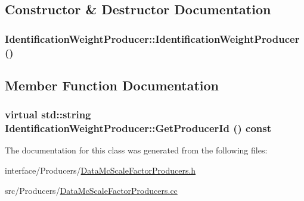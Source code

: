 \subsection{Constructor \& Destructor Documentation}
\hypertarget{classIdentificationWeightProducer_a1fb06b51eec690fc9332fe060853e444}{
\subsubsection[{IdentificationWeightProducer}]{\setlength{\rightskip}{0pt plus 5cm}IdentificationWeightProducer::IdentificationWeightProducer ()}}
\label{classIdentificationWeightProducer_a1fb06b51eec690fc9332fe060853e444}


\subsection{Member Function Documentation}
\hypertarget{classIdentificationWeightProducer_abbf54fd2f0f78f6a4489734373ab6788}{
\subsubsection[{GetProducerId}]{\setlength{\rightskip}{0pt plus 5cm}virtual std::string IdentificationWeightProducer::GetProducerId () const}}
\label{classIdentificationWeightProducer_abbf54fd2f0f78f6a4489734373ab6788}


The documentation for this class was generated from the following files:\begin{DoxyCompactItemize}
\item 
interface/Producers/\hyperlink{DataMcScaleFactorProducers_8h}{DataMcScaleFactorProducers.h}\item 
src/Producers/\hyperlink{DataMcScaleFactorProducers_8cc}{DataMcScaleFactorProducers.cc}\end{DoxyCompactItemize}
